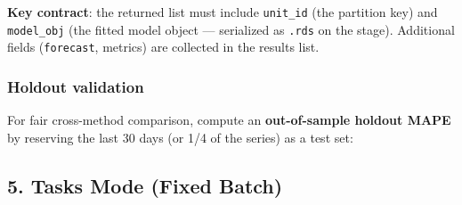 \documentclass[
]{article}
\newenvironment{Shaded}{\begin{snugshade}}{\end{snugshade}}
\newcommand{\AttributeTok}[1]{\textcolor[rgb]{0.13,0.29,0.53}{#1}}
\newcommand{\ConstantTok}[1]{\textcolor[rgb]{0.56,0.35,0.01}{#1}}
\newcommand{\ControlFlowTok}[1]{\textcolor[rgb]{0.13,0.29,0.53}{\textbf{#1}}}
\newcommand{\DataTypeTok}[1]{\textcolor[rgb]{0.13,0.29,0.53}{#1}}
\newcommand{\DecValTok}[1]{\textcolor[rgb]{0.00,0.00,0.81}{#1}}
\newcommand{\FunctionTok}[1]{\textcolor[rgb]{0.13,0.29,0.53}{\textbf{#1}}}
\newcommand{\NormalTok}[1]{#1}
\newcommand{\OtherTok}[1]{\textcolor[rgb]{0.56,0.35,0.01}{#1}}
\newcommand{\SpecialCharTok}[1]{\textcolor[rgb]{0.81,0.36,0.00}{\textbf{#1}}}
\begin{document}
\textbf{Key contract}: the returned list must include \texttt{unit\_id}
(the partition key) and \texttt{model\_obj} (the fitted model object ---
serialized as \texttt{.rds} on the stage). Additional fields
(\texttt{forecast}, metrics) are collected in the results list.

\subsubsection{Holdout validation}\label{holdout-validation}

For fair cross-method comparison, compute an \textbf{out-of-sample
holdout MAPE} by reserving the last 30 days (or 1/4 of the series) as a
test set:

\begin{Shaded}
\end{Shaded}

\subsection{5. Tasks Mode (Fixed Batch)}\label{tasks-mode-fixed-batch}
\end{document}
